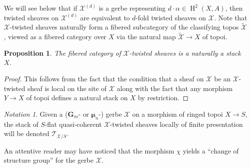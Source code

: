 \documentclass[11pt]{amsart}
\newcommand{\field}[1]{\mathbf #1}
\newcommand{\ms}[1]{\mathscr #1}
\newcommand{\m}{\boldsymbol{\mu}}
\newcommand{\G}{\field G} %
\renewcommand{\H}{\operatorname{H}}
\renewcommand{\[}{[\!\hspace{0.03em}[}
\renewcommand{\]}{]\!\hspace{0.03em}]}
\renewcommand{\(}{(\!\hspace{0.03em}(}
\renewcommand{\)}{)\!\hspace{0.03em})}
\newtheorem{prop}[lem]{Proposition}
\theoremstyle{definition}
\theoremstyle{remark}
\newtheorem{notn}[lem]{Notation}
\begin{document}
We will see below that if $\ms X^{(d)}$ is a gerbe representing 
$d\cdot\alpha\in\H^{2}(X,A)$, then twisted sheaves on $\ms X^{(d)}$ 
are equivalent to $d$-fold twisted sheaves on $\ms X$.  Note that $\ms X$-twisted sheaves naturally form a fibered subcategory of the classifying topos $\widetilde{\ms X}$, viewed as a fibered category over $X$ via the natural map $\widetilde{\ms X}\to X$ of topoi.

\begin{prop}\label{P:twisted sheaves form a stack} The fibered category of $\ms X$-twisted sheaves is a naturally a stack $X$.
\end{prop}
\begin{proof} This follows from the fact that the condition that a sheaf on $\ms X$ be an $\ms X$-twisted sheaf is local on the site of $\ms X$ along with the fact that any morphism $Y\to X$ of topoi defines a natural stack on $X$ by restriction.
\end{proof}

\begin{notn}\label{N:curly T} Given a ($\G_m$- or $\m_n$-) gerbe $\ms X$ on a morphism of ringed topoi $X\to S$, the stack of $S$-flat quasi-coherent $\ms X$-twisted sheaves locally of finite presentation will be denoted $\ms T_{\ms X/S}$.
\end{notn}

An attentive reader may have noticed that the morphism $\chi$ yields a 
``change of structure group'' for the gerbe $\ms X$.
\end{document}
